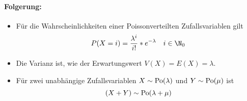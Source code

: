 \paragraph{Folgerung:}
\begin{itemize}
	\item Für die Wahrscheinlichkeiten einer Poissonverteilten Zufallsvariablen gilt
		\begin{equation*}
			P(X=i)=\frac{\lambda^i}{i!}*e^{-\lambda}\quad i\in\N_0
		\end{equation*}
	\item Die Varianz ist, wie der Erwartungswert $V(X)=E(X)=\lambda$.
	\item Für zwei unabhängige Zufallsvariablen $X\sim\operatorname{Po}(\lambda)$ und $Y\sim\operatorname{Po}(\mu)$ ist
	\begin{equation*}
		(X+Y)\sim\operatorname{Po}(\lambda+\mu)
	\end{equation*}
\end{itemize}